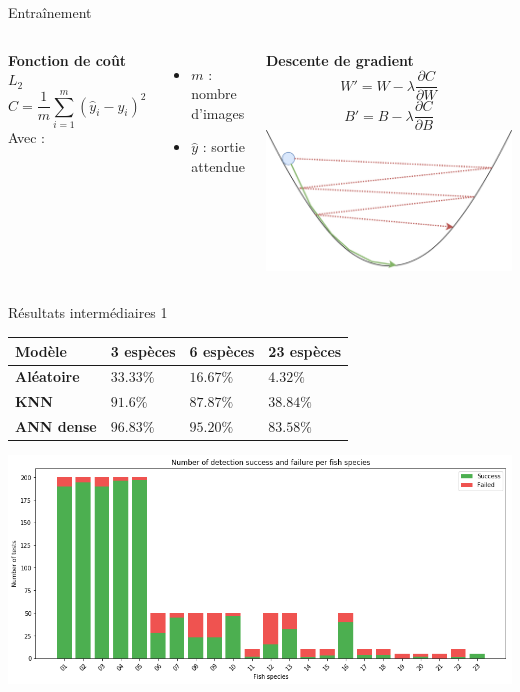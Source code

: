\documentclass[10pt,xcolor={x11names}]{beamer}
\newcommand{\sectitle}[1]{{\large\color{titleblue}\textbf{#1}\\\smallskip}}
\begin{document}
\begin{frame}{Entraînement}
	\begin{columns}[T]
		\sectitle{Fonction de coût $L_2$}
		$$
		C=\frac{1}{m}\sum_{i=1}^m (\hat{y}_i-y_i)^2
		$$
		Avec :
		\begin{itemize}
			\item $m$ : nombre d'images
			\item $\hat{y}$ : sortie attendue
		\end{itemize}
		\sectitle{Descente de gradient}
		$$
		W' = W - \lambda \frac{\partial C}{\partial W}
		$$
		$$
		B' = B - \lambda \frac{\partial C}{\partial B}
		$$
		{\centering\includegraphics[width=\textwidth]{gradient.png}}
	\end{columns}
\end{frame}

\begin{frame}{Résultats intermédiaires 1}
	\begin{tabular}{ |m{10em}|m{5.5em}|m{5.5em}|m{5.5em}| }
		\hline
		Modèle & \textbf{3 espèces} & \textbf{6 espèces} &  \textbf{23 espèces} \\
		\hline
		\textbf{Aléatoire} & $33.33\%$ & $16.67\%$ & $4.32\%$ \\
		\textbf{KNN} & $91.6\%$ & $87.87\%$ & $38.84\%$ \\
		\textbf{ANN dense} & $96.83\%$ & $95.20\%$ & $83.58\%$ \\
		\hline
	\end{tabular}
	\begin{center}
	\includegraphics[width=\linewidth]{dense1_results.png}
	\end{center}
\end{frame}
\end{document}
